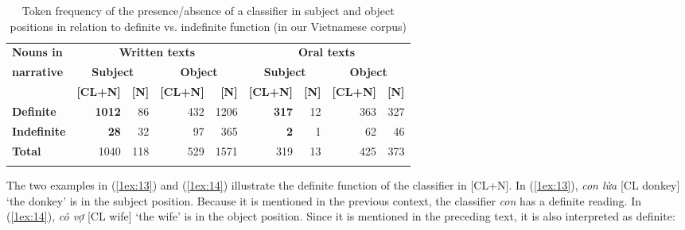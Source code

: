\documentclass[output=paper]{langsci/langscibook}
\begin{document}
\begin{table}
{\small{
\begin{tabularx}{\textwidth}{Xrrrrrrrr}%
\lsptoprule
{\textbf{Nouns in}}  & \multicolumn{4}{c}{\textbf{Written texts}} & \multicolumn{4}{c}{{\textbf{Oral texts}}} \\
\cmidrule{2-9}
{\textbf{narrative}} & \multicolumn{2}{c}{\textbf{Subject}} & \multicolumn{2}{c}{\textbf{Object}} & \multicolumn{2}{c}{\textbf{Subject}} & \multicolumn{2}{c}{\textbf{Object}} \\
\cmidrule(lr){2-5}\cmidrule(lr){6-9}
 & {\textbf{[CL+N]}} & {\textbf{[N]}} & {\textbf{[CL+N]}} & {\textbf{[N]}} & {\textbf{[CL+N]}} & {\textbf{[N]}} & {\textbf{[CL+N]}} & {\textbf{[N]}} \\
\cmidrule(lr){2-3}\cmidrule(lr){4-5}\cmidrule(lr){6-7}\cmidrule(lr){8-9}
{\textbf{Definite}} & {\textbf{1012}} & 86 & 432 & 1206 & {\textbf{317}} & 12 & 363 & 327 \\
{\textbf{Indefinite}} & {\textbf{28}} & 32 & 97 & 365 & {\textbf{2}} & 1 & 62 & 46 \\
{\textbf{Total}} & 1040 & 118 & 529 & 1571 & 319 & 13 & 425 & 373 \\
\lspbottomrule
\end{tabularx}
}}
\caption{Token frequency of the presence/absence of a classifier in subject and object positions in relation to definite vs. indefinite function (in our Vietnamese corpus)}\label{1table:4}
\end{table}

\largerpage[2]
The two examples in (\ref{1ex:13}) and (\ref{1ex:14}) illustrate the definite function of the classifier in [CL+N]. In (\ref{1ex:13}), {\emph{con lừa}} [CL donkey] `the donkey' is in the subject position. Because it is mentioned in the previous context, the classifier {\emph{con}} has a definite reading. In (\ref{1ex:14}), {\emph{cô vợ}} [CL wife] `the wife' is in the object position. Since it is mentioned in the preceding text, it is also interpreted as definite:
\end{document}
